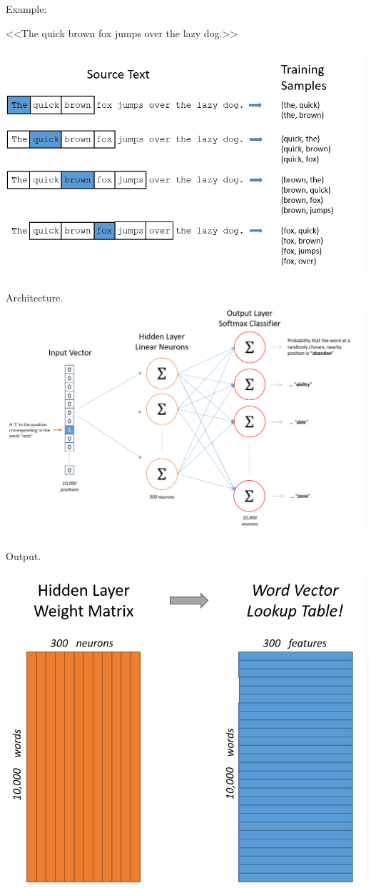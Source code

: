 \documentclass[t, 11pt]{beamer}
\begin{document}
\begin{frame}
	\frametitle{\insertsection}
	\frametitle{\insertsubsection} 
	Example: 
	
	 
	 <<The quick brown fox jumps over the lazy dog.>>
\end{frame}

\begin{frame}
	\frametitle{\insertsection}
	\frametitle{\insertsubsection}  

	\includegraphics[width=0.8\linewidth]{exam.png} 
\end{frame}



\begin{frame}
	\frametitle{\insertsection}
	\frametitle{\insertsubsection}  
	Architecture.
	\includegraphics[width=0.8\linewidth]{arch.png} 
\end{frame}

\begin{frame}
	\frametitle{\insertsection}
	\frametitle{\insertsubsection}  
	Output.
	
	\includegraphics[width=0.6\linewidth]{output.png} 
\end{frame}
\end{document}
